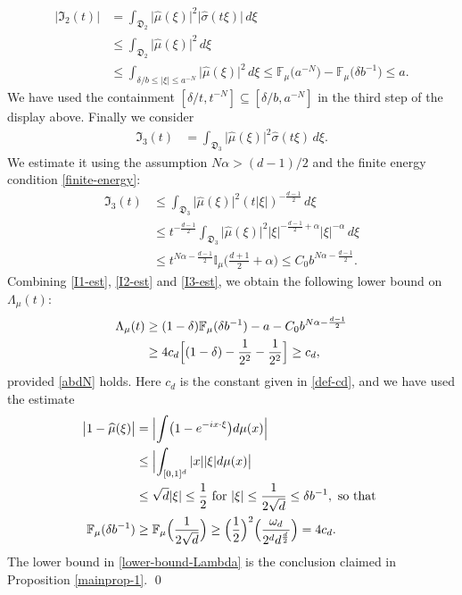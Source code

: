 \documentclass[a4paper,11pt]{amsart}
\numberwithin{equation}{section}
\begin{document}
\begin{align} \bigl| \mathfrak I_2(t) \bigr| &= \int_{\mathfrak D_2} \bigl| \widehat{\mu}(\xi) \bigr|^2 \bigl| \widehat{\sigma}(t \xi) \bigr| \, d \xi \nonumber \\ 
&\leq \int_{\mathfrak D_2} \bigl| \widehat{\mu}(\xi) \bigr|^2  \, d\xi  \nonumber \\ 
&\leq \int_{\delta/b \leq |\xi| \leq a^{-N}} \bigl| \widehat{\mu}(\xi) \bigr|^2  \, d\xi 
\leq \mathbb F_{\mu} \bigl(a^{-N} \bigr) - \mathbb F_{\mu}\bigl(\delta b^{-1}\bigr) \leq a. \label{I2-est}
\end{align}
We have used the containment $[\delta/t, t^{-N}] \subseteq [\delta/b, a^{-N}]$ in the third step of the display above. Finally we consider 
\begin{align*}
\mathfrak I_3(t) &= \int_{\mathfrak D_3} \bigl| \widehat{\mu}(\xi) \bigr|^2 \widehat{\sigma}(t \xi) \, d \xi.  
\end{align*}
We estimate it using the assumption $N\alpha > (d-1)/2$ and the finite energy condition \eqref{finite-energy}: 
\begin{align}
 \mathfrak I_3(t) &\leq \int_{\mathfrak D_3} \bigl| \widehat{\mu}(\xi) \bigr|^2 (t |\xi|)^{-\frac{d-1}{2}} \, d \xi \nonumber \\ 
&\leq t^{-\frac{d-1}{2}} \int_{\mathfrak D_3} \bigl| \widehat{\mu}(\xi) \bigr|^2 |\xi|^{-\frac{d-1}{2} + \alpha} |\xi|^{-\alpha} \, d \xi
\nonumber \\ 
&\leq t^{N\alpha - \frac{d-1}{2}} \mathbb I_{\mu}\bigl(\frac{d+1}{2} + \alpha \bigr) \leq C_0 b^{N\alpha - \frac{d-1}{2}}. \label{I3-est} 
\end{align}
Combining \eqref{I1-est}, \eqref{I2-est} and \eqref{I3-est}, we obtain the following lower bound on $\Lambda_{\mu}(t)$: 
\begin{align}
\Lambda_{\mu}(t) &\geq (1 - \delta) \mathbb F_{\mu}(\delta b^{-1}) - a -  C_0 b^{N\alpha - \frac{d-1}{2}} \nonumber \\ 
&\geq 4c_d \Bigl[(1 - \delta)  - \frac{1}{2^{2}} - \frac{1}{2^2} \Bigr] \geq c_d, \label{lower-bound-Lambda}
\end{align}  
provided \eqref{abdN} holds.  Here $c_d$ is the constant given in \eqref{def-cd}, and we have  used the estimate
\begin{align} \bigl|1 - \widehat{\mu}(\xi) \bigr| &= \Bigl| \int \bigl( 1 - e^{-ix \cdot \xi} \bigr) d\mu(x) \Bigr| \nonumber \\ 
&\leq \Bigl| \int_{[0,1]^d} |x| |\xi| d \mu(x)  \bigr| \nonumber \\ 
&\leq \sqrt{d}|\xi| \leq \frac{1}{2} \text{ for } |\xi| \leq  \frac{1}{2\sqrt{d}} \leq \delta b^{-1}, \text{ so that }  \nonumber  \\
 \mathbb F_{\mu}(\delta b^{-1}) &\geq \mathbb F_{\mu}\Bigl(\frac{1}{2 \sqrt{d}} \Bigr) \geq \Bigl(\frac{1}{2} \Bigr)^{2} \Bigl(\frac{\omega_d}{2^d d^{\frac{d}{2}}}\Bigr) = 4c_d.  \label{F-mu-lower-bound} 
 \end{align}
 The lower bound in \eqref{lower-bound-Lambda} is the conclusion claimed in Proposition \ref{mainprop-1}.  
\qed
\end{document}

